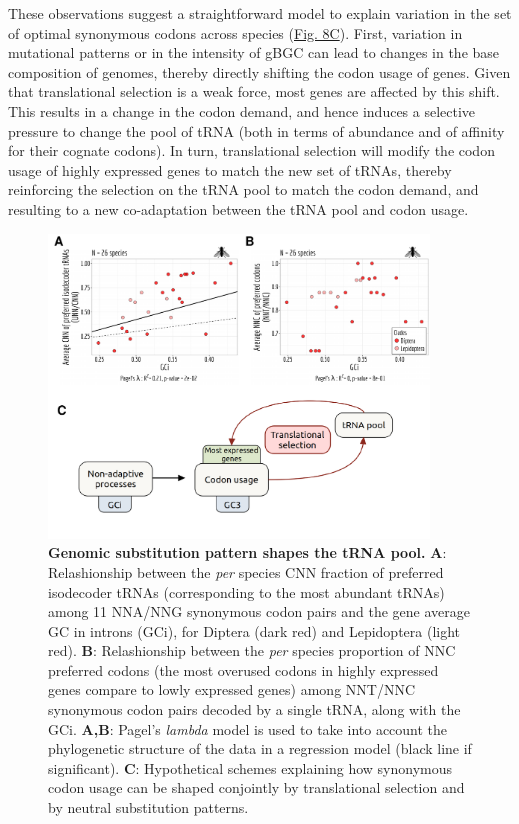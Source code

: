 These observations suggest a straightforward model to explain variation in the set of optimal synonymous codons across species (\hyperref[fig:CU8]{Fig. 8C}). First, variation in mutational patterns or in the intensity of gBGC can lead to changes in the base composition of genomes, thereby directly shifting the codon usage of genes. Given that translational selection is a weak force, most genes are affected by this shift. This results in a change in the codon demand, and hence induces a selective pressure to change the pool of tRNA (both in terms of abundance and of affinity for their cognate codons). In turn, translational selection will modify the codon usage of highly expressed genes to match the new set of tRNAs, thereby reinforcing the selection on the tRNA pool to match the codon demand, and resulting to a new co-adaptation between the tRNA pool and codon usage.


\begin{figure}[t]   
    \begin{center}
        \includegraphics[width=0.9\textwidth]{Figure8.pdf}
    \end{center}                                                                       
    \caption[Genomic substitution pattern shapes the tRNA pool]{\textbf{Genomic substitution pattern shapes the tRNA pool.} \textbf{A}: Relashionship between the \textit{per} species CNN fraction of preferred isodecoder tRNAs (corresponding to the most abundant tRNAs) among 11 NNA/NNG synonymous codon pairs and the gene average GC in introns (GCi), for Diptera (dark red) and Lepidoptera (light red). \textbf{B}: Relashionship between the \textit{per} species proportion of NNC preferred codons (the most overused codons in highly expressed genes compare to lowly expressed genes) among NNT/NNC synonymous codon pairs decoded by a single tRNA, along with the GCi. \textbf{A,B}: Pagel's \textit{lambda} model is used to take into account the phylogenetic structure of the data in a regression model (black line if significant). \textbf{C}: Hypothetical schemes explaining how synonymous codon usage can be shaped conjointly by translational selection and by neutral substitution patterns.}
    \label{fig:CU8}
\end{figure}


